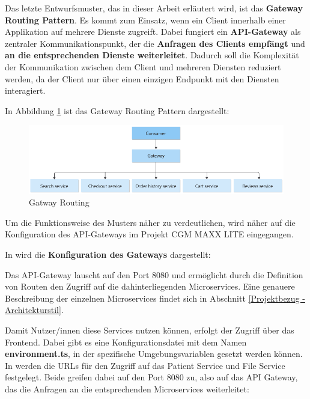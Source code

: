     Das letzte Entwurfsmuster, das in dieser Arbeit erläutert wird, ist das \textbf{Gateway Routing Pattern}.
    Es kommt zum Einsatz, wenn ein Client innerhalb einer Applikation auf mehrere Dienste zugreift. 
    Dabei fungiert ein \textbf{API-Gateway} als zentraler Kommunikationspunkt, der die \textbf{Anfragen des Clients empfängt} und \textbf{an die entsprechenden Dienste weiterleitet}. Dadurch soll die Komplexität der Kommunikation zwischen dem Client und mehreren Diensten reduziert werden, da der Client nur über einen einzigen Endpunkt mit den Diensten interagiert.
    \cite{EA:Web34}
    
    In Abbildung \ref{fig:gateway-routing} ist das Gateway Routing Pattern dargestellt: 
    
    \begin{figure}[H]
        \centering
        \includegraphics[width=1.05\linewidth]{images/EA/gateway-routing.png}
        \caption{Gatway Routing \\ \cite{EA:Web34}}
        \label{fig:gateway-routing}
    \end{figure}

    Um die Funktionsweise des Musters näher zu verdeutlichen, wird näher auf die Konfiguration des API-Gateways im Projekt CGM MAXX LITE eingegangen. 
    
    In  wird die \textbf{Konfiguration des Gateways} dargestellt:
    \vspace{0.3em}
    


    Das API-Gateway lauscht auf den Port 8080 und ermöglicht durch die Definition von Routen den Zugriff auf die dahinterliegenden Microservices. Eine genauere Beschreibung der einzelnen Microservices findet sich in Abschnitt \ref{Projektbezug - Architekturstil}.

     Damit Nutzer/innen diese Services nutzen können, erfolgt der Zugriff über das Frontend. Dabei gibt es eine Konfigurationsdatei mit dem Namen \textbf{environment.ts}, in der spezifische Umgebungsvariablen gesetzt werden können. In  werden die URLs für den Zugriff auf das Patient Service und File Service festgelegt. Beide greifen dabei auf den Port 8080 zu, also auf das API Gateway, das die Anfragen an die entsprechenden Microservices weiterleitet: \\

